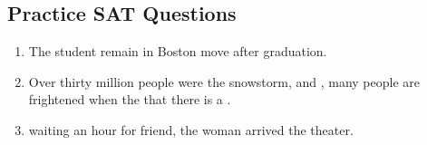 \subsection{Practice SAT Questions}

\begin{enumerate}
\item \begin{inparaenum}[A]
The student   remain in Boston   move   after graduation. 
\end{inparaenum}

\item \begin{inparaenum}[A]
Over thirty million people were  the snowstorm, and , many people are frightened when the  that there is a . 
\end{inparaenum}

\item \begin{inparaenum}[A]
 waiting an hour for  friend, the woman  arrived  the theater. 
\end{inparaenum}

\end{enumerate}



